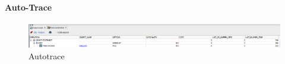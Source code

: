 \paragraph{Auto-Trace} \leavevmode \newline

\begin{figure}[H]
    \centering
    \includegraphics[width=\textwidth]{images/EffScore.png}
    \caption{Autotrace}
\end{figure}